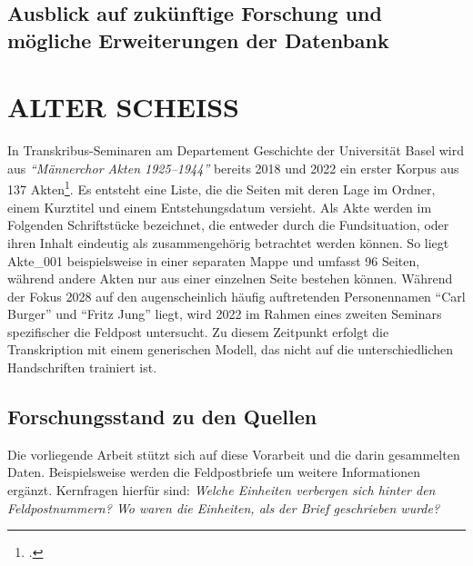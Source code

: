 \documentclass[12pt, a4paper, ngerman, bidi=default]{article}
\let\cite\footcite
\begin{document}
\subsection{Ausblick auf zukünftige Forschung und mögliche Erweiterungen der Datenbank}
\newpage











\begingroup
\small
\pagecolor{OldPaper}
\section{ALTER SCHEISS}

In Transkribus-Seminaren am Departement Geschichte der Universität Basel wird aus \textit{\enquote{Männerchor Akten 1925--1944}} bereits 2018 und 2022 ein 
erster Korpus aus 137 Akten\cite[Weiterführend vgl.][]{burkhardt_feldpost_2022}. Es entsteht eine Liste, die die Seiten mit deren Lage im Ordner, einem Kurztitel und einem Entstehungsdatum versieht. Als Akte werden im Folgenden Schriftstücke bezeichnet, die entweder durch die Fundsituation, 
oder  ihren Inhalt eindeutig als zusammengehörig betrachtet werden können. So liegt Akte\_001 beispielsweise in einer separaten Mappe und umfasst 96 Seiten, 
während andere Akten nur aus einer einzelnen Seite bestehen können.  
Während der Fokus 2028 auf den augenscheinlich häufig auftretenden Personennamen \enquote{Carl Burger} und \enquote{Fritz Jung} liegt, wird 2022 im Rahmen eines zweiten Seminars spezifischer die Feldpost untersucht.
Zu diesem Zeitpunkt erfolgt die Transkription mit einem generischen Modell, das nicht auf die unterschiedlichen Handschriften trainiert 
ist.
\subsection{Forschungsstand zu den Quellen}
Die vorliegende Arbeit stützt sich auf diese Vorarbeit und die darin gesammelten Daten. Beispielsweise werden die Feldpostbriefe um weitere Informationen ergänzt. Kernfragen hierfür sind: \textit{Welche Einheiten verbergen sich hinter den Feldpostnummern? Wo waren die Einheiten, als der Brief geschrieben wurde?}
\end{document}
